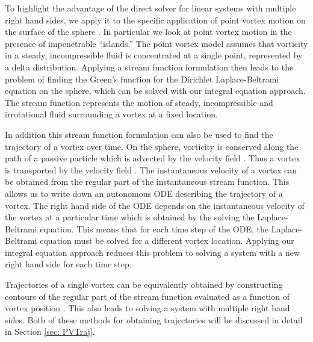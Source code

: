 \documentclass{sfuthesis}
\begin{document}
To highlight the advantage of the direct solver for linear systems with multiple right hand sides, we apply it to the specific application of point vortex motion on the surface of the sphere \cite{Crowdy2006, Newt2001, Kid2000}. In particular we look at point vortex motion in the presence of impenetrable \enquote{islands.} The point vortex model assumes that vorticity in a steady, incompressible fluid is concentrated at a single point, represented by a delta distribution. Applying a stream function formulation then leads to the problem of finding the Green's function for the Dirichlet Laplace-Beltrami equation on the sphere, which can be solved with our integral equation approach. The stream function represents the motion of steady, incompressible and irrotational fluid surrounding a vortex at a fixed location. 

In addition this stream function formulation can also be used to find the trajectory of a vortex over time. On the sphere, vorticity is conserved along the path of a passive particle which is advected by the velocity field \cite{Drit15, Kimura87}. Thus a vortex is transported by the velocity field \cite{Drit15, Kimura87, Crowdy2006, Newt2001, Kid2000}. The instantaneous velocity of a vortex can be obtained from the regular part of the instantaneous stream function. This allows us to write down an autonomous ODE describing the trajectory of a vortex. The right hand side of the ODE depends on the instantaneous velocity of the vortex at a particular time which is obtained by the solving the Laplace-Beltrami equation.  This means that for each time step of the ODE, the Laplace-Beltrami equation must be solved for a different vortex location. Applying our integral equation approach reduces this problem to solving a system with a new right hand side for each time step.  

Trajectories of a single vortex can be equivalently obtained by constructing contours of the regular part of the stream function evaluated as a function of vortex position \cite{Drit15, Crowdy2006, Newt2001, Kid2000}. This also leads to solving a system with multiple right hand sides. Both of these methods for obtaining trajectories will be discussed in detail in Section \ref{sec: PVTraj}. 
\end{document}

